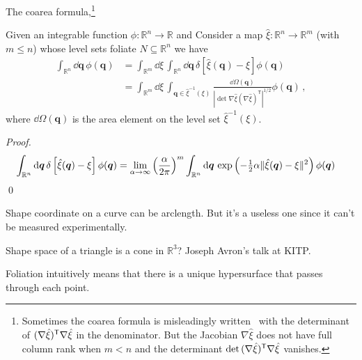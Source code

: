 The coarea formula,\footnote{Sometimes the coarea formula is misleadingly written~\cite{hartmann2007,hartmann2007a} with the determinant of $(\nabla\hat{\xi})^\mathsf{T}\nabla\hat{\xi}$ in the denominator.  But the Jacobian $\nabla\hat{\xi}$ does not have full column rank when $m < n$ and the determinant $\det\,(\nabla\hat{\xi})^\mathsf{T}\nabla\hat{\xi}$ vanishes.}
%
\begin{theorem}
  Given an integrable function $\phi: \mathbb{R}^n \to \mathbb{R}$ and
  Consider a map $\hat{\xi}: \mathbb{R}^n \to \mathbb{R}^m$ (with $m \leq n$) whose level sets foliate $N \subseteq \mathbb{R}^{n}$ we have
  \begin{equation}
    \begin{aligned}
      \int_{\mathbb{R}^n} \dd{\bm{q}}\, \phi(\bm{q}) &= \int_{\mathbb{R}^m} \dd{\xi}\,\int_{\mathbb{R}^n} \dd{\bm{q}}\, \delta\left[\hat{\xi}(\bm{q}) - \xi\right] \phi(\bm{q})\\
                                                     &= \int_{\mathbb{R}^m} \dd{\xi}\,\int_{\bm{q} \in \hat{\xi}^{-1}(\xi)} \frac{\dd{\Omega(\bm{q})}}{|\det \nabla\hat{\xi}(\nabla\hat{\xi})^\mathsf{T}|^{1/2}} \phi(\bm{q})\,,
    \end{aligned}
  \end{equation}
  where $\dd\Omega(\bm{q})$ is the area element on the level set $\hat{\xi}^{-1}(\xi)$.
\end{theorem}
\begin{proof}
  \begin{equation}
    \begin{aligned}
      \int_{\mathbb{R}^{n}} \mathrm{d}\bm{q}\,\delta\left[\hat{\xi}(\bm{q}) - \xi\right] \phi(\bm{q}) &=
      \lim_{\alpha \to \infty} \left(\frac{\alpha}{2\pi}\right)^{m} \int_{\mathbb{R}^{n}} \mathrm{d}\bm{q}\, \exp\left(-\tfrac{1}{2}\alpha\lVert\hat{\xi}(\bm{q}) - \xi\rVert^{2}\right) \phi(\bm{q})
    \end{aligned}
  \end{equation}
  \qed
\end{proof}

Shape coordinate on a curve can be arclength.  But it's a useless one since it can't be measured experimentally.

Shape space of a triangle is a cone in $\mathbb{R}^{3}$? Joseph Avron's talk at KITP.

Foliation intuitively means that there is a unique hypersurface that passes through each point.


